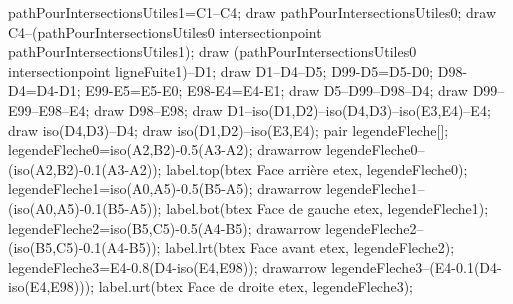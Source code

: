 \begin{exercice*}
\begin{Geometrie}
        pathPourIntersectionsUtiles1=C1--C4;
        draw pathPourIntersectionsUtiles0;
        draw C4--(pathPourIntersectionsUtiles0 intersectionpoint pathPourIntersectionsUtiles1);
        draw (pathPourIntersectionsUtiles0 intersectionpoint ligneFuite1)--D1;
        draw D1--D4--D5;
        D99-D5=D5-D0;
        D98-D4=D4-D1;
        E99-E5=E5-E0;
        E98-E4=E4-E1;
        draw D5--D99--D98--D4;
        draw D99--E99--E98--E4;
        draw D98--E98;
        draw D1--iso(D1,D2)--iso(D4,D3)--iso(E3,E4)--E4;
        draw iso(D4,D3)--D4;
        draw iso(D1,D2)--iso(E3,E4);
        pair legendeFleche[];
        legendeFleche0=iso(A2,B2)-0.5(A3-A2);
        drawarrow legendeFleche0--(iso(A2,B2)-0.1(A3-A2));
        label.top(btex Face arrière etex, legendeFleche0);
        legendeFleche1=iso(A0,A5)-0.5(B5-A5);
        drawarrow legendeFleche1--(iso(A0,A5)-0.1(B5-A5));
        label.bot(btex Face de gauche etex, legendeFleche1);
        legendeFleche2=iso(B5,C5)-0.5(A4-B5);
        drawarrow legendeFleche2--(iso(B5,C5)-0.1(A4-B5));
        label.lrt(btex Face avant etex, legendeFleche2);
        legendeFleche3=E4-0.8(D4-iso(E4,E98));
        drawarrow legendeFleche3--(E4-0.1(D4-iso(E4,E98)));
        label.urt(btex Face de droite etex, legendeFleche3);
    \end{Geometrie}
\end{exercice*}    
